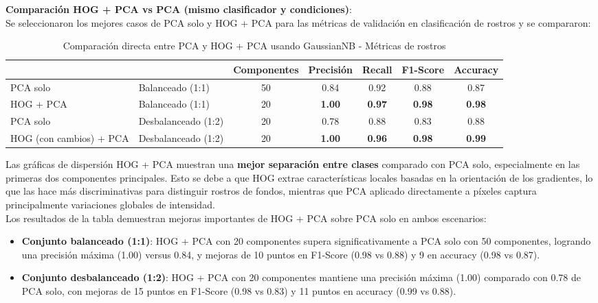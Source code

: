 \documentclass{article}
\begin{document}
\textbf{Comparación HOG + PCA vs PCA (mismo clasificador y condiciones)}:\\

Se seleccionaron los mejores casos de PCA solo y HOG + PCA para las métricas de validación en clasificación de rostros y se compararon:

\begin{table}[H]
    \centering
    \begin{tabular}{|>{\centering\arraybackslash}m{2.7cm}|>{\centering\arraybackslash}m{3.2cm}|c|c|c|c|c|}
    \hline
    \rowcolor{tableblue} \multicolumn{1}{|c|}{\textbf{Método}} & \multicolumn{1}{c|}{\textbf{Dataset}} & \textbf{Componentes} & \textbf{Precisión} & \textbf{Recall} & \textbf{F1-Score} & \textbf{Accuracy} \\
    \hline
    PCA solo & Balanceado (1:1) & 50 & 0.84 & 0.92 & 0.88 & 0.87 \\
    HOG + PCA & Balanceado (1:1) & 20 & \textbf{1.00} & \textbf{0.97} & \textbf{0.98} & \textbf{0.98} \\
    \hline
    PCA solo & Desbalanceado (1:2) & 20 & 0.78 & 0.88 & 0.83 & 0.88 \\
    HOG (con cambios) + PCA & Desbalanceado (1:2) & 20 & \textbf{1.00} & \textbf{0.96} & \textbf{0.98} & \textbf{0.99} \\
    \hline
    \end{tabular}
    \caption{Comparación directa entre PCA y HOG + PCA usando GaussianNB - Métricas de rostros}
    \label{tab:comparison_pca_hog_faces}
\end{table}

Las gráficas de dispersión HOG + PCA muestran una \textbf{mejor separación entre clases} comparado con PCA solo, especialmente en las primeras dos componentes principales. Esto se debe a que HOG extrae características locales basadas en la orientación de los gradientes, lo que las hace más discriminativas para distinguir rostros de fondos, mientras que PCA aplicado directamente a píxeles captura principalmente variaciones globales de intensidad.\\

Los resultados de la tabla demuestran mejoras importantes de HOG + PCA sobre PCA solo en ambos escenarios:

\begin{itemize}
    \item \textbf{Conjunto balanceado (1:1)}: HOG + PCA con 20 componentes supera significativamente a PCA solo con 50 componentes, logrando una precisión máxima (1.00) versus 0.84, y mejoras de 10 puntos en F1-Score (0.98 vs 0.88) y 9 en accuracy (0.98 vs 0.87).

    \item \textbf{Conjunto desbalanceado (1:2)}: HOG + PCA con 20 componentes mantiene una precisión máxima (1.00) comparado con 0.78 de PCA solo, con mejoras de 15 puntos en F1-Score (0.98 vs 0.83) y 11 puntos en accuracy (0.99 vs 0.88).
\end{itemize}
\end{document}
